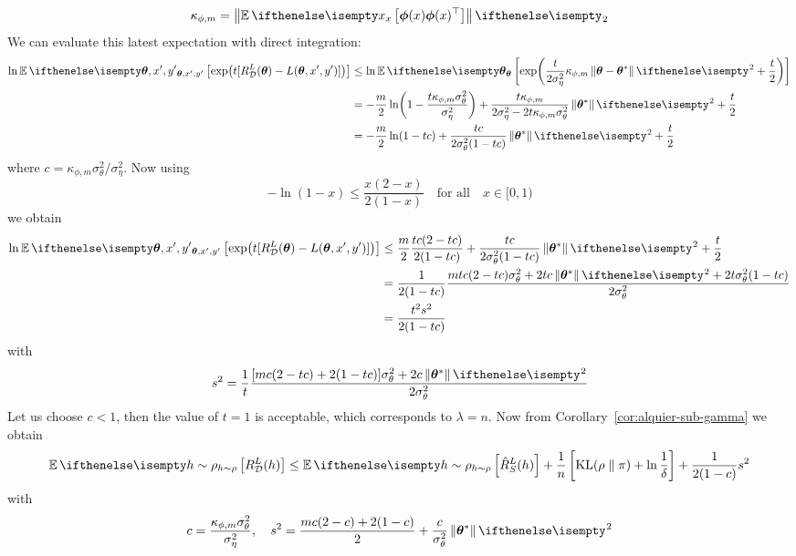 \begin{equation}
  \kappa_{\phi, m} = \Norm{\Ev[x]{\Vec{\phi}(x) \Vec{\phi}(x)^\top}}_2
\end{equation}
We can evaluate this latest expectation with direct integration:
\begin{equation}
  \begin{split}
    \ln \Ev[\Vec{\theta}, x', y']{\exp(t [R_\CD^L(\Vec{\theta}) -
    L(\Vec{\theta}, x', y')])}
    &\leq \ln \Ev[\Vec{\theta}]{\exp(\frac{t}{2 \sigma_\eta^2} \kappa_{\phi, m}
    \Norm{\Vec{\theta} - \Vec{\theta}^*}^2 + \frac{t}{2})} \\
    &= -\frac{m}{2} \ln(1 - \frac{t \kappa_{\phi,m}
    \sigma_\theta^2}{\sigma_\eta^2}) + \frac{t \kappa_{\phi, m}}{2 \sigma_\eta^2
    - 2 t \kappa_{\phi, m} \sigma_\theta^2} \Norm{\Vec{\theta}^*}^2 +
    \frac{t}{2} \\
    &= - \frac{m}{2} \ln(1 - t c) + \frac{t c}{2 \sigma_\theta^2 (1 - t c)}
    \Norm{\Vec{\theta}^*}^2 + \frac{t}{2}
  \end{split}
\end{equation}
where $c = \kappa_{\phi, m} \sigma_\theta^2 / \sigma_\eta^2$. Now using
\begin{equation}
  - \ln(1 - x) \leq \frac{x (2 - x)}{2 (1 - x)} \quad \text{for all} \quad x \in
  [0, 1)
\end{equation}
we obtain
\begin{equation}
  \begin{split}
    \ln \Ev[\Vec{\theta}, x', y']{\exp(t [R_\CD^L(\Vec{\theta}) -
    L(\Vec{\theta}, x', y')])}
    &\leq \frac{m}{2} \frac{t c (2 - t c)}{2 (1 - t c)} + \frac{t c}{2
    \sigma_\theta^2 (1 - t c)} \Norm{\Vec{\theta}^*}^2 + \frac{t}{2} \\
    &= \frac{1}{2 (1 - t c)} \frac{m t c (2 - t c) \sigma_\theta^2 + 2 t c
    \Norm{\Vec{\theta}^*}^2 + 2 t \sigma_\theta^2 (1 - t c)}{2 \sigma_\theta^2}
    \\
    &= \frac{t^2 s^2}{2 (1 - t c)}
  \end{split}
\end{equation}
with
\begin{equation}
  s^2 = \frac{1}{t} \frac{[m c (2 - t c) + 2 (1 - t c)] \sigma_\theta^2 + 2 c
  \Norm{\Vec{\theta}^*}^2}{2 \sigma_\theta^2}
\end{equation}
Let us choose $c < 1$, then the value of $t = 1$ is acceptable, which
corresponds to $\lambda = n$. Now from Corollary~\ref{cor:alquier-sub-gamma} we
obtain
\begin{equation}
  \Ev[h \sim \rho]{R_\CD^L(h)} \leq \Ev[h \sim \rho]{\hat{R}_S^L(h)} +
  \frac{1}{n}\left[\KL{\rho}{\pi} + \ln \frac{1}{\delta}\right] +
  \frac{1}{2 (1 - c)} s^2
\end{equation}
with
\begin{equation}
  c = \frac{\kappa_{\phi, m} \sigma_\theta^2}{\sigma_\eta^2}, \quad s^2 =
  \frac{m c (2 - c) + 2 (1 - c)}{2} + \frac{c}{\sigma_\theta^2}
  \Norm{\Vec{\theta}^*}^2
\end{equation}

